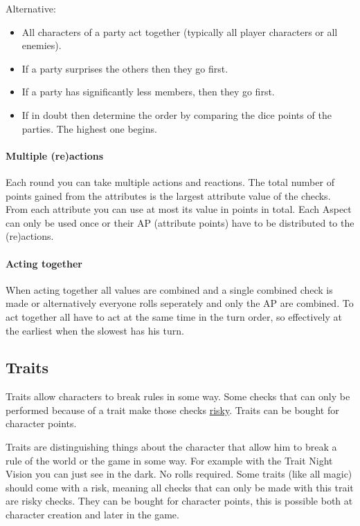 \documentclass[11pt]{article}
\begin{document}
{Alternative:
\begin{itemize}
\item All characters of a party act together (typically all player characters or all enemies).
\item If a party surprises the others then they go first.
\item If a party has significantly less members, then they go first.
\item If in doubt then determine the order by comparing the dice points of the parties. The highest one begins.
\end{itemize}

\paragraph*{Multiple (re)actions}
\label{sec:org54b165e}
Each round you can take multiple actions and reactions. The total number of points gained from the attributes is the largest attribute value of the checks. From each attribute you can use at most its value in points in total. Each Aspect can only be used once or their AP (attribute points) have to be distributed to the (re)actions.

\paragraph*{Acting together}
\label{sec:org3f6ae0d}
When acting together all values are combined and a single combined check is made or alternatively everyone rolls seperately and only the AP are combined. To act together all have to act at the same time in the turn order, so effectively at the earliest when the slowest has his turn.

\subsection{Traits}
\label{sec:orgbab9a7c}
\begin{short}
Traits allow characters to break rules in some way. Some checks that can only be performed because of a trait make those checks \hyperref[sec:org94c7aba]{risky}. Traits can be bought for character points.
\end{short}

Traits are distinguishing things about the character that allow him to break a rule of the world or the game in some way. For example with the Trait Night Vision you can just see in the dark. No rolls required. Some traits (like all magic) should come with a risk, meaning all checks that can only be made with this trait are risky checks. They can be bought for character points, this is possible both at character creation and later in the game.

}
\end{document}
